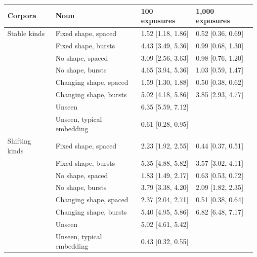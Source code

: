 \begin{tabular}{@{}llll@{}}
\toprule
Corpora & Noun & 100 exposures & 1,000 exposures \\
\midrule
Stable kinds & Fixed shape, spaced & 1.52 {[}1.18, 1.86{]} & 0.52 {[}0.36, 0.69{]} \\
 & Fixed shape, bursts & 4.43 {[}3.49, 5.36{]} & 0.99 {[}0.68, 1.30{]} \\
 & No shape, spaced & 3.09 {[}2.56, 3.63{]} & 0.98 {[}0.76, 1.20{]} \\
 & No shape, bursts & 4.65 {[}3.94, 5.36{]} & 1.03 {[}0.59, 1.47{]} \\
 & Changing shape, spaced & 1.59 {[}1.30, 1.88{]} & 0.50 {[}0.38, 0.62{]} \\
 & Changing shape, bursts & 5.02 {[}4.18, 5.86{]} & 3.85 {[}2.93, 4.77{]} \\
 & Unseen & 6.35 {[}5.59, 7.12{]} &  \\
 & Unseen, typical embedding & 0.61 {[}0.28, 0.95{]} &  \\
\midrule
Shifting kinds & Fixed shape, spaced & 2.23 {[}1.92, 2.55{]} & 0.44 {[}0.37, 0.51{]} \\
 & Fixed shape, bursts & 5.35 {[}4.88, 5.82{]} & 3.57 {[}3.02, 4.11{]} \\
 & No shape, spaced & 1.83 {[}1.49, 2.17{]} & 0.63 {[}0.53, 0.72{]} \\
 & No shape, bursts & 3.79 {[}3.38, 4.20{]} & 2.09 {[}1.82, 2.35{]} \\
 & Changing shape, spaced & 2.37 {[}2.04, 2.71{]} & 0.51 {[}0.38, 0.64{]} \\
 & Changing shape, bursts & 5.40 {[}4.95, 5.86{]} & 6.82 {[}6.48, 7.17{]} \\
 & Unseen & 5.02 {[}4.61, 5.42{]} &  \\
 & Unseen, typical embedding & 0.43 {[}0.32, 0.55{]} &  \\
\bottomrule
\end{tabular}
